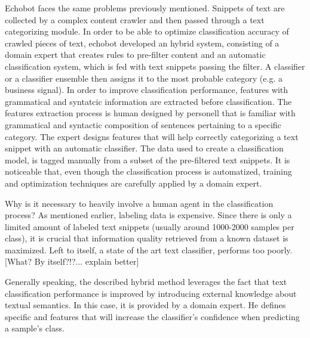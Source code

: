 Echobot faces the same problems previously mentioned. Snippets of text are collected by a complex content crawler and then passed through a text categorizing module. In order to be able to optimize classification accuracy of crawled pieces of text, echobot developed an hybrid system, consisting of a domain expert that creates rules to pre-filter content and an automatic classification system, which is fed with text snippets passing the filter. A classifier or a classifier ensemble then assigns it to the most probable category (e.g. a business signal). In order to improve classification performance, features with grammatical and syntatcic information are extracted before classification. The features extraction process is human designed by personell that is familiar with grammatical and syntactic composition of sentences pertaining to a specific category. The expert designs features that will help correctly categorizing a text snippet with an automatic classifier. The data used to create a classification model, is tagged manually from a subset of the pre-filtered text snippets. It is noticeable that, even though the classification process is automatized, training and optimization techniques are carefully applied by a domain expert. 

Why is it necessary to heavily involve a human agent in the classification process? As mentioned earlier, labeling data is expensive. Since there is only a limited amount of labeled text snippets (usually around 1000-2000 samples per class), it is crucial that information quality retrieved from a known dataset is maximized. Left to itself, a state of the art text classifier, performs too poorly. [What? By itself?!?... explain better]

Generally speaking, the described hybrid method leverages the fact that text classification performance is improved by introducing external knowledge about textual semantics. In this case, it is provided by a domain expert.  He defines specific and features that will increase the classifier's confidence when predicting a sample's class. 

